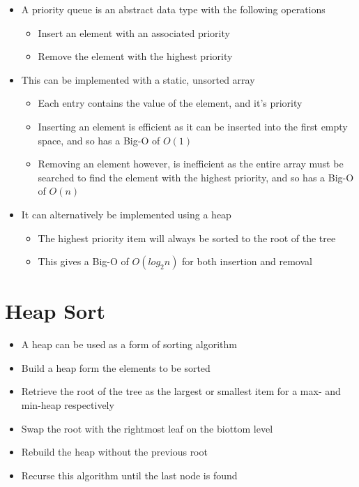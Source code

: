 \begin{itemize}
  \item A priority queue is an abstract data type with the following operations
  \begin{itemize}
    \item Insert an element with an associated priority
    \item Remove the element with the highest priority
  \end{itemize}
  \item This can be implemented with a static, unsorted array
  \begin{itemize}
    \item Each entry contains the value of the element, and it's priority
    \item Inserting an element is efficient as it can be inserted into the first empty space, and so has a Big-O of $O(1)$
    \item Removing an element however, is inefficient as the entire array must be searched to find the element with the highest priority, and so has a Big-O of $O(n)$
  \end{itemize}
  \item It can alternatively be implemented using a heap
  \begin{itemize}
    \item The highest priority item will always be sorted to the root of the tree
    \item This gives a Big-O of $O(log_2 n)$ for both insertion and removal
  \end{itemize}
\end{itemize}

\section*{Heap Sort}

\begin{itemize}
  \item A heap can be used as a form of sorting algorithm
  \item Build a heap form the elements to be sorted
  \item Retrieve the root of the tree as the largest or smallest item for a max- and min-heap respectively
  \item Swap the root with the rightmost leaf on the biottom level
  \item Rebuild the heap without the previous root
  \item Recurse this algorithm until the last node is found
\end{itemize}

